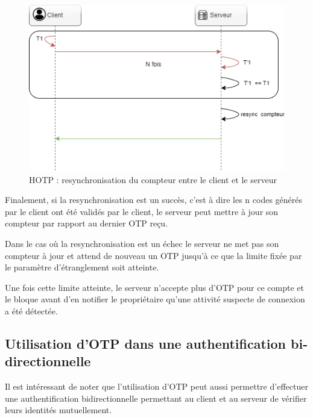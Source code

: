 \documentclass[a4paper, 10pt]{article}
\newcommand{\otp}{\textsc{OTP} }
\newcommand{\hotp}{\textsc{HOTP} }
\begin{document}
\begin{figure}[H]
        \centering
        \includegraphics[scale=0.5]{img/1/4/otp-resync.drawio.png}
        \caption{\hotp: resynchronisation du compteur entre le client et le serveur\\}
        \label{fig:hotp-resync}
\end{figure}


    Finalement, si la \textcolor{myblue}{resynchronisation est un succès}, c'est à dire les n codes générés par le client ont été validés par le client, 
le serveur peut \textcolor{mygreen}{mettre à jour son compteur} par rapport au dernier \otp reçu.

Dans le cas où la \textcolor{myblue}{resynchronisation est un échec} le serveur ne met pas son compteur à jour et \textcolor{mygreen}{attend de nouveau un \otp}
jusqu’à ce que la limite fixée par le \textcolor{mygreen}{paramètre d’étranglement soit atteinte}.

Une fois cette limite atteinte, le serveur n'accepte plus d'\otp pour ce compte et le bloque avant d'en notifier le propriétaire qu'une
attivité suspecte de connexion a été détectée.





        \subsection{Utilisation d'\otp dans une authentification bi-directionnelle}

    Il est intéressant de noter que l'utilisation d'\otp peut aussi permettre d'effectuer une \textcolor{myblue}{authentification bidirectionnelle}
permettant au client et au serveur de  \textcolor{mygreen}{vérifier leurs identités mutuellement}. 
\end{document}
